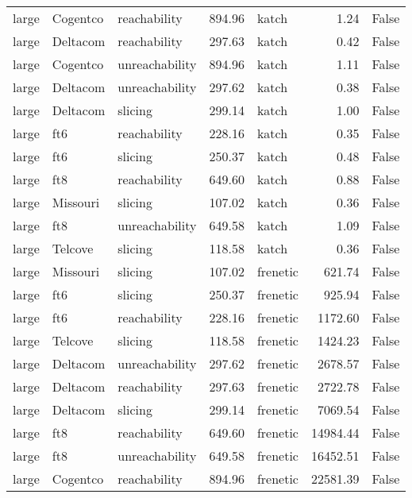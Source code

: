 \begin{tabular}{lllrlrr}
large & Cogentco & reachability & 894.96 & katch & 1.24 & False \\
large & Deltacom & reachability & 297.63 & katch & 0.42 & False \\
large & Cogentco & unreachability & 894.96 & katch & 1.11 & False \\
large & Deltacom & unreachability & 297.62 & katch & 0.38 & False \\
large & Deltacom & slicing & 299.14 & katch & 1.00 & False \\
large & ft6 & reachability & 228.16 & katch & 0.35 & False \\
large & ft6 & slicing & 250.37 & katch & 0.48 & False \\
large & ft8 & reachability & 649.60 & katch & 0.88 & False \\
large & Missouri & slicing & 107.02 & katch & 0.36 & False \\
large & ft8 & unreachability & 649.58 & katch & 1.09 & False \\
large & Telcove & slicing & 118.58 & katch & 0.36 & False \\
large & Missouri & slicing & 107.02 & frenetic & 621.74 & False \\
large & ft6 & slicing & 250.37 & frenetic & 925.94 & False \\
large & ft6 & reachability & 228.16 & frenetic & 1172.60 & False \\
large & Telcove & slicing & 118.58 & frenetic & 1424.23 & False \\
large & Deltacom & unreachability & 297.62 & frenetic & 2678.57 & False \\
large & Deltacom & reachability & 297.63 & frenetic & 2722.78 & False \\
large & Deltacom & slicing & 299.14 & frenetic & 7069.54 & False \\
large & ft8 & reachability & 649.60 & frenetic & 14984.44 & False \\
large & ft8 & unreachability & 649.58 & frenetic & 16452.51 & False \\
large & Cogentco & reachability & 894.96 & frenetic & 22581.39 & False \\
\bottomrule
\end{tabular}
